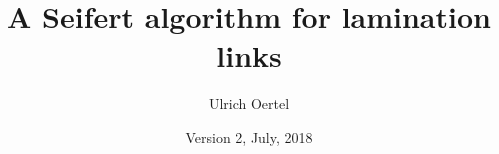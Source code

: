 \documentclass[12pt]{article}
\title{A Seifert algorithm for lamination links }
\author{Ulrich Oertel}
\date{Version 2, July, 2018}
\theoremstyle{remark}
\begin{document}
\maketitle


\def\HDS{half-disk sum}

\def\PLength{\text{Length}}

\def\Area{\text{Area}}
\def\Im{\text{Im}}
\def\im{\text{Im}}
\def\cl{\text{cl}}
\def\rel{\text{ rel }}
\def\irred{irreducible}
\def\half{spinal pair }
\def\spinal{\half}
\def\spinals{\halfs}
\def\halfs{spinal pairs }
\def\reals{\mathbb R}
\def\rationals{\mathbb Q}
\def\complex{\mathbb C}
\def\naturals{\mathbb N}
\def\integers{\mathbb Z}
\def\id{\text{id}}
\def\Chi{\raise1.5pt \hbox{$\chi$}}
\def\cr{\tt\large}


\def\proj{P}
\def\hyp {\hbox {\rm {H \kern -2.8ex I}\kern 1.15ex}}

\def\Diff{\text{Diff}}

\def\weight#1#2#3{{#1}\raise2.5pt\hbox{$\centerdot$}\left({#2},{#3}\right)}
\def\intr{{\rm int}}
\def\inter{\ \raise4pt\hbox{$^\circ$}\kern -1.6ex}
\def\Cal{\cal}
\def\from{:}
\def\inverse{^{-1}}
\def\Max{{\rm Max}}
\def\Min{{\rm Min}}
\def\fr{{\rm fr}}
\def\embed{\hookrightarrow}
\def\Genus{{\rm Genus}}
\def\Z{Z}
\def\X{X}
\end{document}
